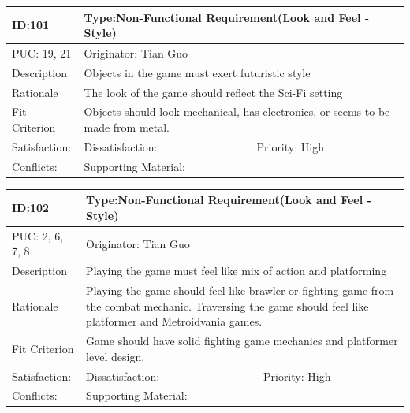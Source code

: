 \documentclass{article}
\begin{document}
	\begin{table}[H]
		\begin{tabular}{|l|l|l|}
			\hline
			ID:101 & \multicolumn{2}{l|}{Type:Non-Functional Requirement(Look and Feel - Style)} \\ \hline
			PUC: 19, 21 & \multicolumn{2}{m{0.85\textwidth}|}{Originator: Tian Guo} \\ \hline
			Description & \multicolumn{2}{m{0.85\textwidth}|}{Objects in the game must exert futuristic style} \\ \hline
			Rationale & \multicolumn{2}{m{0.85\textwidth}|}{The look of the game should reflect the Sci-Fi setting} \\ \hline
			Fit Criterion & \multicolumn{2}{m{0.85\textwidth}|}{Objects should look mechanical, has electronics, or seems to be made from metal.} \\ \hline
			Satisfaction: & Dissatisfaction: & Priority: High\\ \hline
			Conflicts: & \multicolumn{2}{l|}{Supporting Material:} \\ \hline
		\end{tabular}
	\end{table}

	\begin{table}[H]
		\begin{tabular}{|l|l|l|}
			\hline
			ID:102 & \multicolumn{2}{l|}{Type:Non-Functional Requirement(Look and Feel - Style)} \\ \hline
			PUC: 2, 6, 7, 8 & \multicolumn{2}{l|}{Originator: Tian Guo} \\ \hline
			Description & \multicolumn{2}{m{0.85\textwidth}|}{Playing the game must feel like mix of action and platforming} \\ \hline
			Rationale & \multicolumn{2}{m{0.85\textwidth}|}{Playing the game should feel like brawler or fighting game from the combat mechanic. Traversing the game should feel like platformer and Metroidvania games.} \\ \hline
			Fit Criterion & \multicolumn{2}{m{0.85\textwidth}|}{Game should have solid fighting game mechanics and platformer level design.} \\ \hline
			Satisfaction: & Dissatisfaction: & Priority: High\\ \hline
			Conflicts: & \multicolumn{2}{l|}{Supporting Material:} \\ \hline
		\end{tabular}
	\end{table}
\end{document}
